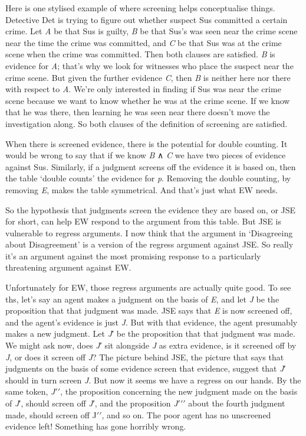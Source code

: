 \documentclass[
  10pt,
  letterpaper,
  DIV=11,
  numbers=noendperiod,
  twoside]{scrartcl}
\begin{document}
Here is one stylised example of where screening helps conceptualise
things. Detective Det is trying to figure out whether suspect Sus
committed a certain crime. Let \emph{A} be that Sus is guilty, \emph{B}
be that Sus's was seen near the crime scene near the time the crime was
committed, and \emph{C} be that Sus was at the crime scene when the
crime was committed. Then both clauses are satisfied. \emph{B} is
evidence for \emph{A}; that's why we look for witnesses who place the
suspect near the crime scene. But given the further evidence \emph{C},
then \emph{B} is neither here nor there with respect to \emph{A}. We're
only interested in finding if Sus was near the crime scene because we
want to know whether he was at the crime scene. If we know that he was
there, then learning he was seen near there doesn't move the
investigation along. So both clauses of the definition of screening are
satisfied.

When there is screened evidence, there is the potential for double
counting. It would be wrong to say that if we know \emph{B} ∧ \emph{C}
we have two pieces of evidence against Sus. Similarly, if a judgment
screens off the evidence it is based on, then the table `double counts'
the evidence for \emph{p}. Removing the double counting, by removing
\emph{E}, makes the table symmetrical. And that's just what EW needs.

So the hypothesis that judgments screen the evidence they are based on,
or JSE for short, can help EW respond to the argument from this table.
But JSE is vulnerable to regress arguments. I now think that the
argument in `Disagreeing about Disagreement' is a version of the regress
argument against JSE. So really it's an argument against the most
promising response to a particularly threatening argument against EW.

Unfortunately for EW, those regress arguments are actually quite good.
To see ths, let's say an agent makes a judgment on the basis of
\emph{E}, and let \emph{J} be the proposition that that judgment was
made. JSE says that \emph{E} is now screened off, and the agent's
evidence is just \emph{J}. But with that evidence, the agent presumably
makes a new judgment. Let \emph{J}′ be the proposition that that
judgment was made. We might ask now, does \emph{J}′ sit alongside
\emph{J} as extra evidence, is it screened off by \emph{J}, or does it
screen off \emph{J}? The picture behind JSE, the picture that says that
judgments on the basis of some evidence screen that evidence, suggest
that \emph{J}′ should in turn screen \emph{J}. But now it seems we have
a regress on our hands. By the same token, \emph{J}\(\prime \prime\),
the proposition concerning the new judgment made on the basis of
\emph{J}′, should screen off \emph{J}′, and the proposition
\emph{J}\(\prime \prime \prime\) about the fourth judgment made, should
screen off J\(\prime \prime\), and so on. The poor agent has no
unscreened evidence left! Something has gone horribly wrong.
\end{document}
